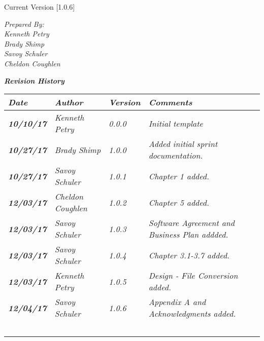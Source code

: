 


Current Version [1.0.6]
\vspace*{5mm}

{\color{SDColor5}
\noindent
\textit{Prepared By:}\\
\textit{Kenneth Petry}\\
\textit{Brady Shimp}\\
\textit{Savoy Schuler}\\
\textit{Cheldon Coughlen}
}

\vfill
\noindent
{\color{SDColor3} \textit{\textbf{Revision History}}}\\
\begin{tabular}{|>{\raggedright}p{1.5cm}|>{\raggedright}p{3cm}|>{\raggedright}p{1.5cm}|>{\raggedright}p{9cm}|}
  \hline
  \textit{\textbf{Date}} &  \textit{\textbf{Author}} & \textit{\textbf{Version}} & \textit{\textbf{Comments}}\tabularnewline
  \hline
  \textit{\textbf{10/10/17}} & \textit{Kenneth Petry} & \textit{0.0.0} & \textit{Initial template}\tabularnewline\hline
  \textit{\textbf{10/27/17}} & \textit{Brady Shimp} & \textit{1.0.0} & \textit{Added initial sprint documentation.}\tabularnewline\hline
  \textit{\textbf{10/27/17}} & \textit{Savoy Schuler} & \textit{1.0.1} & \textit{Chapter 1 added.}\tabularnewline\hline
  \textit{\textbf{12/03/17}} & \textit{Cheldon Coughlen} & \textit{1.0.2} & \textit{Chapter 5 added.}\tabularnewline\hline
  \textit{\textbf{12/03/17}} & \textit{Savoy Schuler} & \textit{1.0.3} & \textit{Software Agreement and Business Plan addded.}\tabularnewline\hline
  \textit{\textbf{12/03/17}} & \textit{Savoy Schuler} & \textit{1.0.4} & \textit{Chapter 3.1-3.7 added.}\tabularnewline\hline
  \textit{\textbf{12/03/17}} & \textit{Kenneth Petry} & \textit{1.0.5} & \textit{Design - File Conversion added.}\tabularnewline\hline  \textit{\textbf{12/04/17}} & \textit{Savoy Schuler} & \textit{1.0.6} & \textit{Appendix A and Acknowledgments added.}\tabularnewline\hline
  &  &  & \tabularnewline
  \hline
  &  &  & \tabularnewline
  \hline
  &  &  & \tabularnewline
  \hline
  &  &  & \tabularnewline
  \hline
  &  &  & \tabularnewline
  \hline
\end{tabular}
\vfill

